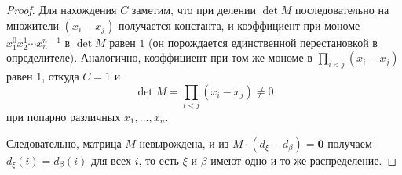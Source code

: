 \begin{proof}
Для нахождения $C$ заметим, что при делении $\det M$ последовательно на множители
$(x_i - x_j)$ получается константа, и коэффициент при мономе
$x_1^0 x_2^1 \cdots x_n^{n-1}$ в $\det M$ равен $1$
(он порождается единственной перестановкой в определителе).
Аналогично, коэффициент при том же мономе в $\prod_{i<j}(x_i - x_j)$ равен $1$,
откуда $C = 1$ и
\[
\det M = \prod_{i < j}(x_i - x_j) \neq 0
\]
при попарно различных $x_1, \ldots, x_n$.

Следовательно, матрица $M$ невырождена, и из $M \cdot (d_\xi - d_\beta) = \mathbf{0}$
получаем $d_\xi(i) = d_\beta(i)$ для всех $i$, то есть $\xi$ и $\beta$
имеют одно и то же распределение. 
\end{proof}
